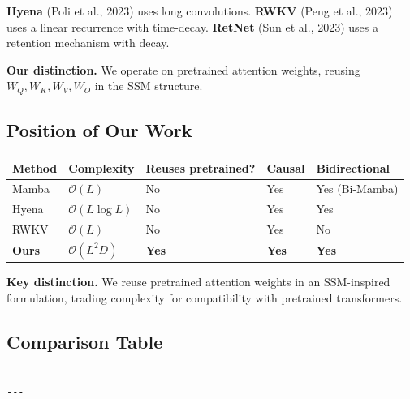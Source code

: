 \textbf{Hyena} (Poli et al., 2023) uses long convolutions. \textbf{RWKV} (Peng et al., 
2023) uses a linear recurrence with time-decay. \textbf{RetNet} (Sun et al., 2023) 
uses a retention mechanism with decay.

\textbf{Our distinction.} We operate on pretrained attention weights, reusing 
$W_Q, W_K, W_V, W_O$ in the SSM structure.

\subsection{Position of Our Work}

\begin{table}[H]
\centering
\small
\begin{tabular}{lllll}
\toprule
\textbf{Method} & \textbf{Complexity} & \textbf{Reuses pretrained?} & \textbf{Causal} & \textbf{Bidirectional} \\
\midrule
Mamba & $\mathcal{O}(L)$ & No & Yes & Yes (Bi-Mamba) \\
Hyena & $\mathcal{O}(L \log L)$ & No & Yes & Yes \\
RWKV & $\mathcal{O}(L)$ & No & Yes & No \\
\textbf{Ours} & \textbf{$\mathcal{O}(L^2 D)$} & \textbf{Yes} & \textbf{Yes} & \textbf{Yes} \\
\bottomrule
\end{tabular}
\end{table}

\textbf{Key distinction.} We reuse pretrained attention weights in an SSM-inspired 
formulation, trading complexity for compatibility with pretrained transformers.



\subsection{Comparison Table}

\begin{lstlisting}

---
\end{lstlisting}